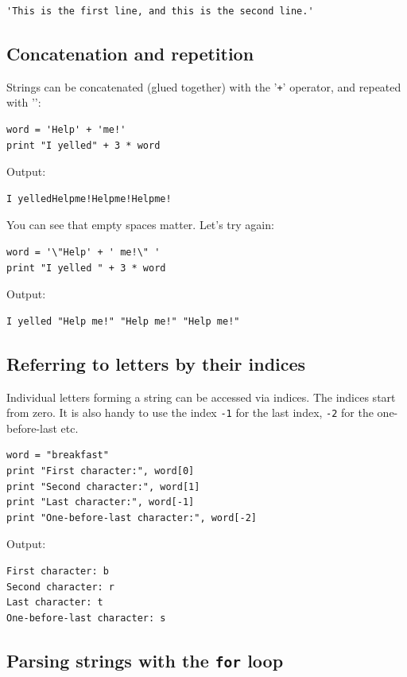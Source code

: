 \begin{verbatim}
'This is the first line, and this is the second line.'
\end{verbatim}


\subsection{Concatenation and repetition}

Strings can be concatenated (glued together) with the '{\tt +}' operator, and repeated with '{\tt *}':

\begin{verbatim}
word = 'Help' + 'me!'
print "I yelled" + 3 * word
\end{verbatim}
Output:

\begin{verbatim}
I yelledHelpme!Helpme!Helpme!
\end{verbatim}
You can see that empty spaces matter. Let's try again:

\begin{verbatim}
word = '\"Help' + ' me!\" '
print "I yelled " + 3 * word
\end{verbatim}
Output:

\begin{verbatim}
I yelled "Help me!" "Help me!" "Help me!"
\end{verbatim}

\subsection{Referring to letters by their indices}\label{subsec:ind}

Individual letters forming a string can be accessed via indices. The indices 
start from zero. It is also handy to use the index {\tt -1} 
for the last index, {\tt -2} for the one-before-last etc.

\begin{verbatim}
word = "breakfast"
print "First character:", word[0]
print "Second character:", word[1]
print "Last character:", word[-1]
print "One-before-last character:", word[-2]
\end{verbatim}
Output:

\begin{verbatim}
First character: b
Second character: r
Last character: t
One-before-last character: s
\end{verbatim}

\subsection{Parsing strings with the {\tt for} loop}\label{subsec:forstr} 

